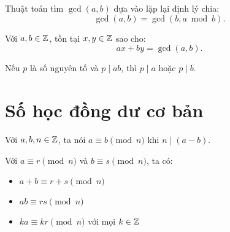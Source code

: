 \documentclass[../imo-training-open-book.tex]{subfiles}
\begin{document}
\begin{theorem*}
    \label{theorem:euclidean-algorithm}
    Thuật toán tìm \( \gcd(a, b) \) dựa vào lặp lại định lý chia:
    \[
        \gcd(a, b) = \gcd(b, a \bmod b).
    \]
\end{theorem*}

\vspace{1em}

\begin{theorem*}
    \label{theorem:bezout}
    Với \( a, b \in \mathbb Z \), tồn tại \( x, y \in \mathbb Z \) sao cho:
    \[
        ax + by = \gcd(a, b).
    \]
\end{theorem*}

\vspace{1em}

\begin{theorem*}
    \label{theorem:prime-divides-product}
    Nếu \( p \) là số nguyên tố và \( p \mid ab \), thì \( p \mid a \) hoặc \( p \mid b \).
\end{theorem*}

\newpage

\section{Số học đồng dư cơ bản}

\begin{definition*}
    \label{definition:modular-congruence}
    Với \( a, b, n \in \mathbb Z \), ta nói \( a \equiv b \pmod{n} \) khi \( n \mid (a - b) \).
\end{definition*}

\vspace{1em}

\begin{theorem*}
    \label{theorem:modular-properties}
    Với \( a \equiv r \pmod{n} \) và \( b \equiv s \pmod{n} \), ta có:
    \begin{itemize}[topsep=0pt, itemsep=0pt]
        \item \( a + b \equiv r + s \pmod{n} \)
        \item \( ab \equiv rs \pmod{n} \)
        \item \( ka \equiv kr \pmod{n} \) với mọi \( k \in \mathbb Z \)
    \end{itemize}
\end{theorem*}
\end{document}
